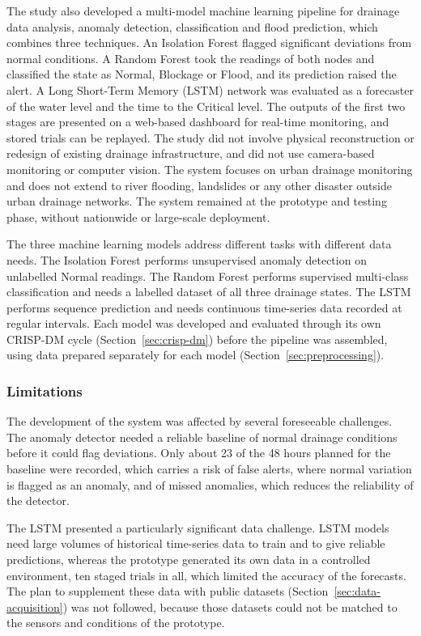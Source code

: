 \documentclass[12pt, a4paper]{article}
\begin{document}
The study also developed a multi-model machine learning pipeline for drainage data analysis, anomaly detection, classification and flood prediction, which combines three techniques. An Isolation Forest flagged significant deviations from normal conditions. A Random Forest took the readings of both nodes and classified the state as Normal, Blockage or Flood, and its prediction raised the alert. A Long Short-Term Memory (LSTM) network was evaluated as a forecaster of the water level and the time to the Critical level. The outputs of the first two stages are presented on a web-based dashboard for real-time monitoring, and stored trials can be replayed.
\clearpage
The study did not involve physical reconstruction or redesign of existing drainage infrastructure, and did not use camera-based monitoring or computer vision. The system focuses on urban drainage monitoring and does not extend to river flooding, landslides or any other disaster outside urban drainage networks. The system remained at the prototype and testing phase, without nationwide or large-scale deployment.

The three machine learning models address different tasks with different data needs. The Isolation Forest performs unsupervised anomaly detection on unlabelled Normal readings. The Random Forest performs supervised multi-class classification and needs a labelled dataset of all three drainage states. The LSTM performs sequence prediction and needs continuous time-series data recorded at regular intervals. Each model was developed and evaluated through its own CRISP-DM cycle (Section~\ref{sec:crisp-dm}) before the pipeline was assembled, using data prepared separately for each model (Section~\ref{sec:preprocessing}).

\subsubsection{Limitations}
\label{sec:limitations}

The development of the system was affected by several foreseeable challenges. The anomaly detector needed a reliable baseline of normal drainage conditions before it could flag deviations. Only about 23 of the 48 hours planned for the baseline were recorded, which carries a risk of false alerts, where normal variation is flagged as an anomaly, and of missed anomalies, which reduces the reliability of the detector.

The LSTM presented a particularly significant data challenge. LSTM models need large volumes of historical time-series data to train and to give reliable predictions, whereas the prototype generated its own data in a controlled environment, ten staged trials in all, which limited the accuracy of the forecasts. The plan to supplement these data with public datasets (Section~\ref{sec:data-acquisition}) was not followed, because those datasets could not be matched to the sensors and conditions of the prototype.
\end{document}
